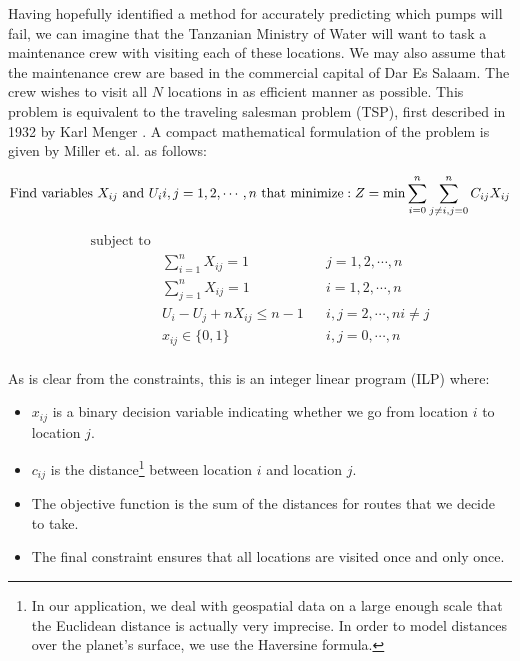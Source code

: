 \documentclass{article} %
\begin{document}
Having hopefully identified a method for accurately predicting which pumps will fail, we can imagine that the Tanzanian Ministry of Water will want to task a maintenance crew with visiting each of these locations. We may also assume that the maintenance crew are based in the commercial capital of Dar Es Salaam. The crew wishes to visit all $N$ locations in as efficient manner as possible. This problem is equivalent to the traveling salesman problem (TSP), first described in 1932 by Karl Menger \cite{Menger}. A compact mathematical formulation of the problem is given by Miller et. al. \cite{Miller1960} as follows:


\begin{equation*}
\textrm{Find variables } X_{ij} \textrm{ and } U_i i,j = 1, 2, \cdots , n \textrm{ that minimize}:\\
Z = \min \sum_{i=0}^n \sum_{j\ne i,j=0}^n C_{ij} X_{ij}
\end{equation*}

\begin{align*}
\textrm{subject to} & \\
	& \sum_{i=1}^n X_{ij} = 1 && j = 1, 2 , \cdots, n \\
	& \sum_{j=1}^n X_{ij} = 1 && i = 1, 2, \cdots, n \\
	&U_i - U_j + nX_{ij} \le n-1 && i, j = 2, \cdots, n i\ne j \\
	& x_{ij} \in \{0, 1\} && i,j=0, \cdots, n \\
\end{align*}

As is clear from the constraints, this is an integer linear program (ILP) where:

\begin{itemize}
  \item $x_{ij}$ is a binary decision variable indicating whether we go from location $i$ to location $j$.
  \item $c_{ij}$ is the distance\footnote{In our application, we deal with geospatial data on a large enough scale that the Euclidean distance is actually very imprecise. In order to model distances over the planet's surface, we use the Haversine formula.} between location $i$ and location $j$.
  \item The objective function is the sum of the distances for routes that we decide to take.
  \item The final constraint ensures that all locations are visited once and only once.
\end{itemize}
\end{document}
